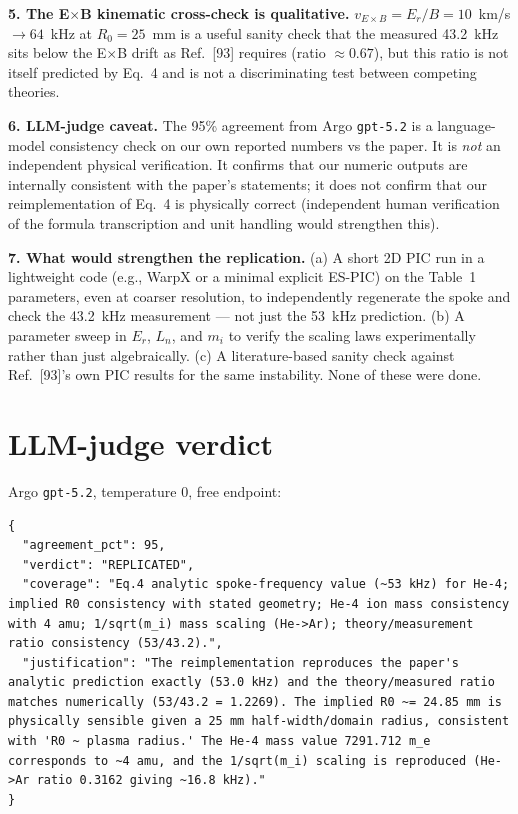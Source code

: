 \documentclass[11pt]{article}
\begin{document}
\textbf{5. The E$\times$B kinematic cross-check is qualitative.} $v_{E\times B}
= E_r/B = 10$~km/s $\to 64$~kHz at $R_0 = 25$~mm is a useful sanity check
that the measured 43.2~kHz sits below the E$\times$B drift as Ref.~[93]
requires (ratio $\approx 0.67$), but this ratio is not itself predicted by
Eq.~4 and is not a discriminating test between competing theories.

\textbf{6. LLM-judge caveat.} The 95\% agreement from Argo \texttt{gpt-5.2}
is a language-model consistency check on our own reported numbers vs the
paper. It is \emph{not} an independent physical verification. It confirms
that our numeric outputs are internally consistent with the paper's
statements; it does not confirm that our reimplementation of Eq.~4 is
physically correct (independent human verification of the formula
transcription and unit handling would strengthen this).

\textbf{7. What would strengthen the replication.} (a) A short 2D PIC run
in a lightweight code (e.g., WarpX or a minimal explicit ES-PIC) on the
Table~1 parameters, even at coarser resolution, to independently regenerate
the spoke and check the 43.2~kHz measurement --- not just the 53~kHz
prediction. (b) A parameter sweep in $E_r$, $L_n$, and $m_i$ to verify the
scaling laws experimentally rather than just algebraically. (c) A
literature-based sanity check against Ref.~[93]'s own PIC results for the
same instability. None of these were done.

\section{LLM-judge verdict}
Argo \texttt{gpt-5.2}, temperature 0, free endpoint:
\begin{lstlisting}
{
  "agreement_pct": 95,
  "verdict": "REPLICATED",
  "coverage": "Eq.4 analytic spoke-frequency value (~53 kHz) for He-4; implied R0 consistency with stated geometry; He-4 ion mass consistency with 4 amu; 1/sqrt(m_i) mass scaling (He->Ar); theory/measurement ratio consistency (53/43.2).",
  "justification": "The reimplementation reproduces the paper's analytic prediction exactly (53.0 kHz) and the theory/measured ratio matches numerically (53/43.2 = 1.2269). The implied R0 ~= 24.85 mm is physically sensible given a 25 mm half-width/domain radius, consistent with 'R0 ~ plasma radius.' The He-4 mass value 7291.712 m_e corresponds to ~4 amu, and the 1/sqrt(m_i) scaling is reproduced (He->Ar ratio 0.3162 giving ~16.8 kHz)."
}
\end{lstlisting}
\end{document}
